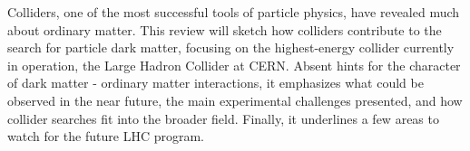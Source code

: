 Colliders, one of the most successful tools of particle physics, have revealed much about ordinary matter.
This review will sketch how colliders contribute to the search for particle dark matter, focusing on the highest-energy collider currently in operation, the Large Hadron Collider at CERN.
Absent hints for the character of dark matter - ordinary matter interactions, it emphasizes what could be observed in the near future, the main experimental challenges presented, and how collider searches fit into the broader field.
Finally, it underlines a few areas to watch for the future LHC program.
